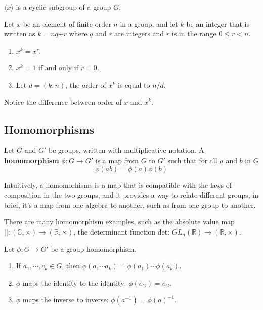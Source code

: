 \documentclass{tufte-handout}
\newcommand{\C}{\mathbb{C}}
\newcommand{\R}{\mathbb{R}}
\begin{document}
$\langle x \rangle$ is a cyclic subgroup of a group $G$,

\begin{proposition}
	\normalfont
	Let $x$ be an element of finite order $n$ in a group, and let $k$ be an integer that is written as $k=nq$$+r$ where $q$ and $r$ are integers and $r$ is in the range $0\le r<n$.
	\begin{enumerate}
		\item $x^k=x^r$.
		\item $x^k=1$ if and only if $r=0$.
		\item Let $d=(k,n)$, the order of $x^k$ is equal to $n/d$.
	\end{enumerate}
\end{proposition}

Notice the difference between order of $x$ and $x^k$.

\subsection{Homomorphisms}

Let $G$ and $G'$ be groups, written with multiplicative notation. A \textbf{homomorphism} $\phi: G\rightarrow G'$ is a map from $G$ to $G'$ such that for all $a$ and $b$ in $G$
\begin{equation}
	\phi(ab)=\phi(a)\phi(b)
	\nonumber
\end{equation}

Intuitively, a homomorhisms is a map that is compatible with the laws of composition in the two groups, and it provides a way to relate different groups, in brief, it's a map from one algebra to another, such as from one group to another.

There are many homomorphism examples, such as the absolute value map $||: (\C, \times)\rightarrow (\R, \times)$, the determinant function det: $GL_n(\R)\rightarrow (\R, \times)$.

\begin{proposition}
	\normalfont
	Let $\phi : G\rightarrow G'$ be a group homomorphism.
	\begin{enumerate}
		\item If $a_1,\cdots,c_k \in G$, then $\phi(a_1\cdots a_k)=\phi(a_1)\cdots\phi(a_k)$.
		\item $\phi$ maps the identity to the identity: $\phi(e_{G})=e_{G}$.
		\item $\phi$ maps the inverse to inverse: $\phi(a^{-1})=\phi(a)^{-1}$.
	\end{enumerate}
\end{proposition}
\end{document}
